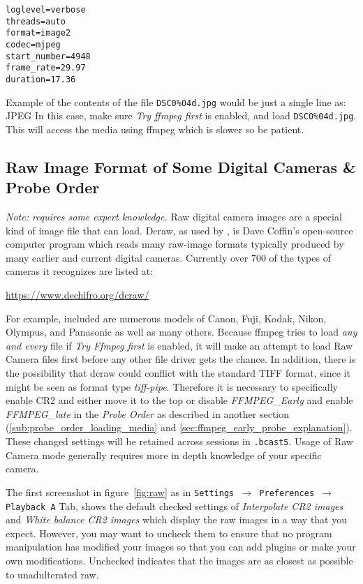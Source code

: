 \begin{lstlisting}[style=sh,caption={Example
    DSC0\%04d.opts},captionpos=t]
loglevel=verbose
threads=auto
format=image2
codec=mjpeg 
start_number=4948
frame_rate=29.97
duration=17.36
\end{lstlisting}

Example of the contents of the file \texttt{DSC0\%04d.jpg} would be just a single line as:  JPEG
In this case, make sure \textit{Try ffmpeg first} is enabled, and load \texttt{DSC0\%04d.jpg}.  
This will access the media using ffmpeg which is slower so be patient.

\subsection{Raw Image Format of Some Digital Cameras \& Probe Order}%
\label{sub:raw_image_format_digital_camera_probe_order}

\textit{Note: requires some expert knowledge.}  Raw digital camera images are a special kind of image file that \CGG{} can load. Dcraw, as used by \CGG{}, is Dave Coffin’s open-source computer program which reads many raw-image formats typically produced by many earlier and current digital cameras.  Currently over 700 of the types of cameras it recognizes are listed at:

\hspace{4em}	{\small \url{https://www.dechifro.org/dcraw/}}

For example, included are numerous models of Canon, Fuji, Kodak, Nikon, Olympus, and Panasonic as well as many others.  Because ffmpeg tries to load \textit{any and every} file if \textit{Try Ffmpeg first} is enabled, it will make an attempt to load Raw Camera files first before any other file driver gets the chance.  In addition, there is the possibility that dcraw could conflict with the standard TIFF format, since it might be seen as format type \textit{tiff-pipe}.  Therefore it is necessary to specifically enable CR2 and either move it to the top or disable \textit{FFMPEG\_Early} and enable \textit{FFMPEG\_late} in the \textit{Probe Order} as described in another section (\ref{sub:probe_order_loading_media} and \ref{sec:ffmpeg_early_probe_explanation}).  These changed settings will be retained across \CGG{} sessions in \texttt{.bcast5}.  Usage of Raw Camera mode generally requires more in depth knowledge of your specific camera.

The first screenshot in figure~\ref{fig:raw} as in \texttt{Settings $\rightarrow$ Preferences $\rightarrow$ Playback A} Tab, shows the default checked settings of \textit{Interpolate CR2 images} and \textit{White balance CR2 images} which display the raw images in a way that you expect.  However, you may want to uncheck them to ensure that no program manipulation has modified your images so that you can add plugins or make your own modifications.  Unchecked indicates that the images are as closest as possible to unadulterated raw.

